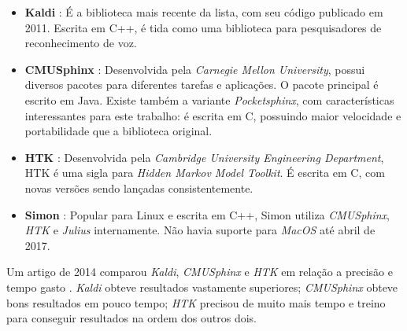 \begin{itemize}
\item \textbf{Kaldi} \citep{kaldi}: É a biblioteca mais recente da lista, com seu código publicado em 2011. Escrita em C++, é tida como uma biblioteca para pesquisadores de reconhecimento de voz.

\item \textbf{CMUSphinx} \citep{cmusphinx}: Desenvolvida pela \textit{Carnegie Mellon University}, possui diversos pacotes para diferentes tarefas e aplicações. O pacote principal é escrito em Java. Existe também a variante \emph{Pocketsphinx}, com características interessantes para este trabalho: é escrita em C, possuindo maior velocidade e portabilidade que a biblioteca original.

\item \textbf{HTK} \citep{htk}: Desenvolvida pela \textit{Cambridge University Engineering Department}, HTK é uma sigla para \textit{Hidden Markov Model Toolkit}. É escrita em C, com novas versões sendo lançadas consistentemente.

\item \textbf{Simon} \citep{Simon}: Popular para Linux e escrita em C++, Simon utiliza \textit{CMUSphinx}, \textit{HTK} e \textit{Julius} internamente. Não havia suporte para \textit{MacOS} até abril de 2017.
\end{itemize}

Um artigo de 2014 comparou \emph{Kaldi}, \emph{CMUSphinx} e \emph{HTK} em relação a precisão e tempo gasto \citep{compareSpeech}. \emph{Kaldi} obteve resultados vastamente superiores; \emph{CMUSphinx} obteve bons resultados em pouco tempo; \emph{HTK} precisou de muito mais tempo e treino para conseguir resultados na ordem dos outros dois.

